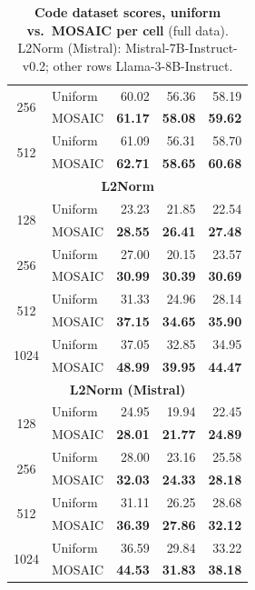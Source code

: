 \begin{table}[tp]
\begin{tabular}{@{} c l rrr @{}}
    \cmidrule(l){1-5}
    \multirow{2}{*}{256} & Uniform & 60.02 & 56.36 & 58.19 \\
     & MOSAIC & \textbf{61.17} & \textbf{58.08} & \textbf{59.62} \\
    \cmidrule(l){1-5}
    \multirow{2}{*}{512} & Uniform & 61.09 & 56.31 & 58.70 \\
     & MOSAIC & \textbf{62.71} & \textbf{58.65} & \textbf{60.68} \\
    \midrule
    \multicolumn{5}{c}{\textbf{L2Norm}} \\
    \midrule
    \multirow{2}{*}{128} & Uniform & 23.23 & 21.85 & 22.54 \\
     & MOSAIC & \textbf{28.55} & \textbf{26.41} & \textbf{27.48} \\
    \cmidrule(l){1-5}
    \multirow{2}{*}{256} & Uniform & 27.00 & 20.15 & 23.57 \\
     & MOSAIC & \textbf{30.99} & \textbf{30.39} & \textbf{30.69} \\
    \cmidrule(l){1-5}
    \multirow{2}{*}{512} & Uniform & 31.33 & 24.96 & 28.14 \\
     & MOSAIC & \textbf{37.15} & \textbf{34.65} & \textbf{35.90} \\
    \cmidrule(l){1-5}
    \multirow{2}{*}{1024} & Uniform & 37.05 & 32.85 & 34.95 \\
     & MOSAIC & \textbf{48.99} & \textbf{39.95} & \textbf{44.47} \\
    \midrule
    \multicolumn{5}{c}{\textbf{L2Norm (Mistral)}} \\
    \midrule
    \multirow{2}{*}{128} & Uniform & 24.95 & 19.94 & 22.45 \\
     & MOSAIC & \textbf{28.01} & \textbf{21.77} & \textbf{24.89} \\
    \cmidrule(l){1-5}
    \multirow{2}{*}{256} & Uniform & 28.00 & 23.16 & 25.58 \\
     & MOSAIC & \textbf{32.03} & \textbf{24.33} & \textbf{28.18} \\
    \cmidrule(l){1-5}
    \multirow{2}{*}{512} & Uniform & 31.11 & 26.25 & 28.68 \\
     & MOSAIC & \textbf{36.39} & \textbf{27.86} & \textbf{32.12} \\
    \cmidrule(l){1-5}
    \multirow{2}{*}{1024} & Uniform & 36.59 & 29.84 & 33.22 \\
     & MOSAIC & \textbf{44.53} & \textbf{31.83} & \textbf{38.18} \\
    \bottomrule
  \end{tabular}
  \caption{\textbf{Code dataset scores, uniform vs.\ MOSAIC per cell} (full data). L2Norm (Mistral): Mistral-7B-Instruct-v0.2; other rows Llama-3-8B-Instruct.}
  \label{tab:app-lb-CODE}
\end{table}

